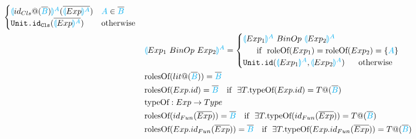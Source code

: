 \documentclass[11pt]{jarticle}
\begin{document}
\begin{alignat*}{2}
  \begin{cases}
    \color{cyan}\llparenthesis \color{black}id_{Cls}@(\overline{\color{cyan}B}) \color{cyan}\rrparenthesis^A \color{black}(\overline{\color{cyan}\llparenthesis \color{black}Exp \color{cyan}\rrparenthesis^A}\color{black}) & \color{cyan}A \color{black} \in \overline{\color{cyan}B}\\
    \texttt{Unit.id}_\texttt{Cls}(\overline{\color{cyan}\llparenthesis \color{black}Exp \color{cyan}\rrparenthesis^A}) &\text{otherwise}
  \end{cases}\\
  &&&\color{cyan}\llparenthesis \color{black}Exp_1~BinOp~Exp_2 \color{cyan}\rrparenthesis^A \color{black}=
  \begin{cases}
    \color{cyan}\llparenthesis \color{black}Exp_1 \color{cyan}\rrparenthesis^A \color{black} ~BinOp~ \color{cyan}\llparenthesis \color{black}Exp_2 \color{cyan}\rrparenthesis^A \\
    ~~~~~\color{black} \text{if}~~\text{roleOf}(Exp_1) = \text{roleOf}(Exp_2) = \{\color{cyan}A\color{black}\}\\
    \texttt{Unit.id}(\color{cyan}\llparenthesis \color{black}Exp_1 \color{cyan}\rrparenthesis^A \color{black}, \color{cyan}\llparenthesis \color{black}Exp_2 \color{cyan}\rrparenthesis^A \color{black})  ~~~~~\color{black} \text{otherwise}
  \end{cases}\\
  &&&\text{rolesOf}(lit@(\overline{\color{cyan}B})) = {\overline{\color{cyan}B}}\\
  &&&\text{rolesOf}(Exp.id) = \overline{\color{cyan}B}~~~\text{if}~~\exists T.\text{typeOf}(Exp.id) = T@(\overline{\color{cyan}B})\\
  &&&\text{typeOf}:Exp \rightarrow Type\\
  &&&\text{rolesOf}(id_{Fun}(\overline{Exp})) = \overline{\color{cyan}B}~~~\text{if}~~\exists T.\text{typeOf}(id_{Fun}(\overline{Exp})) = T@(\overline{\color{cyan}B})\\
  &&&\text{rolesOf}(Exp.id_{Fun}(\overline{Exp})) = \overline{\color{cyan}B}~~~\text{if}~~\exists T.\text{typeOf}(Exp.id_{Fun}(\overline{Exp})) = T@(\overline{\color{cyan}B})\\
\end{alignat*}
\end{document}
